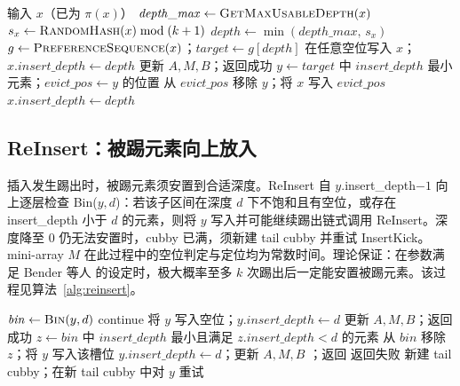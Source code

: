 \begin{algorithm}[htbp]
  \caption{InsertKick：k-kick 插入}
  \label{alg:insert-kick}
  \begin{algorithmic}[1]
    \State 输入 $x$（已为 $\pi(x)$）
    \State $\mathit{depth\_max}\gets \Call{GetMaxUsableDepth}{x}$
    \State $s_x\gets\Call{RandomHash}{x}\bmod(k+1)$
    \State $\mathit{depth}\gets\min(\mathit{depth\_max},\,s_x)$
    \State $g\gets\Call{PreferenceSequence}{x}$；$\mathit{target}\gets g[\mathit{depth}]$
      \State 在任意空位写入 $x$；$x.insert\_depth\gets\mathit{depth}$
      \State 更新 $A,M,B$；返回成功
    \Else
      \State $y\gets\mathit{target}$ 中 $insert\_depth$ 最小元素；$\mathit{evict\_pos}\gets y$ 的位置
      \State 从 $\mathit{evict\_pos}$ 移除 $y$；将 $x$ 写入 $\mathit{evict\_pos}$
      \State $x.insert\_depth\gets\mathit{depth}$
      \State {}
    \EndIf
  \end{algorithmic}
\end{algorithm}

\subsection{ReInsert：被踢元素向上放入}

插入发生踢出时，被踢元素须安置到合适深度。ReInsert 自 \(y.\)insert\_depth\(-1\) 向上逐层检查 Bin(\(y,d\))：若该子区间在深度 \(d\) 下不饱和且有空位，或存在 insert\_depth 小于 \(d\) 的元素，则将 \(y\) 写入并可能继续踢出链式调用 ReInsert。深度降至 0 仍无法安置时，cubby 已满，须新建 tail cubby 并重试 InsertKick。mini-array \(M\) 在此过程中的空位判定与定位均为常数时间。理论保证：在参数满足 Bender 等人\cite{bender2022otsh} 的设定时，极大概率至多 \(k\) 次踢出后一定能安置被踢元素。该过程见算法~\ref{alg:reinsert}。

\begin{algorithm}[htbp]
  \caption{ReInsert：被踢元素向上找空位}
  \label{alg:reinsert}
  \begin{algorithmic}[1]
        \State $\mathit{bin}\gets\Call{Bin}{y,d}$
          \State continue
        \EndIf
          \State 将 $y$ 写入空位；$y.insert\_depth\gets d$
          \State 更新 $A,M,B$；返回成功
          \State $z\gets\mathit{bin}$ 中 $insert\_depth$ 最小且满足 $z.insert\_depth<d$ 的元素
          \State 从 $\mathit{bin}$ 移除 $z$；将 $y$ 写入该槽位
          \State $y.insert\_depth\gets d$；更新 $A,M,B$
          \State {}；返回
        \EndIf
      \EndFor
      \State 返回失败 
      \State 新建 tail cubby；在新 tail cubby 中对 $y$ 重试 
    \EndFunction
  \end{algorithmic}
\end{algorithm}

